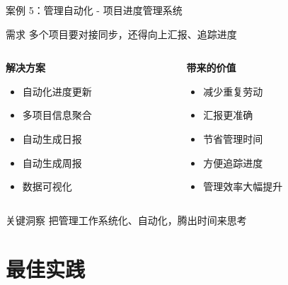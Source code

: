 \documentclass[aspectratio=169,xcolor=dvipsnames]{beamer}
\begin{document}
\begin{frame}{案例 5：管理自动化 - 项目进度管理系统}
  \begin{block}{需求}
    多个项目要对接同步，还得向上汇报、追踪进度
  \end{block}

  \begin{columns}
    \begin{column}{0.48\textwidth}
      \textbf{解决方案}
      \begin{itemize}
        \item 自动化进度更新
        \item 多项目信息聚合
        \item 自动生成日报
        \item 自动生成周报
        \item 数据可视化
      \end{itemize}
    \end{column}
    \begin{column}{0.48\textwidth}
      \textbf{带来的价值}
      \begin{itemize}
        \item 减少重复劳动
        \item 汇报更准确
        \item 节省管理时间
        \item 方便追踪进度
        \item 管理效率大幅提升
      \end{itemize}
    \end{column}
  \end{columns}

  \vspace{0.3cm}

  \begin{alertblock}{关键洞察}
    把管理工作系统化、自动化，腾出时间来思考
  \end{alertblock}
\end{frame}

\section{最佳实践}
\end{document}
